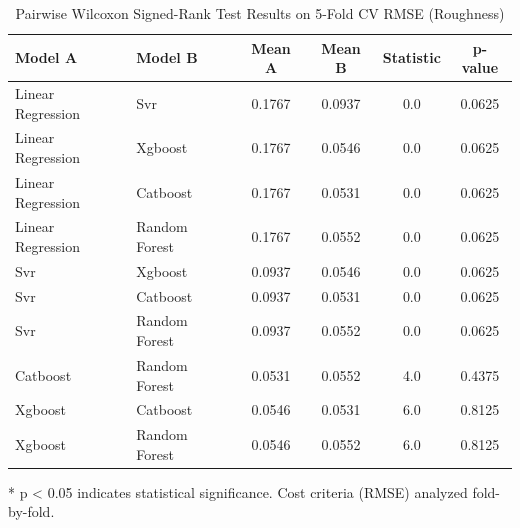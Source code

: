 \begin{table}[htbp]
\centering
\caption{Pairwise Wilcoxon Signed-Rank Test Results on 5-Fold CV RMSE (Roughness)}
\label{tab:wilcoxon_roughness}
\begin{tabular}{llcccc}
\toprule
\textbf{Model A} & \textbf{Model B} & \textbf{Mean A} & \textbf{Mean B} & \textbf{Statistic} & \textbf{p-value} \\
\midrule
Linear Regression & Svr & 0.1767 & 0.0937 & 0.0 & 0.0625 \\
Linear Regression & Xgboost & 0.1767 & 0.0546 & 0.0 & 0.0625 \\
Linear Regression & Catboost & 0.1767 & 0.0531 & 0.0 & 0.0625 \\
Linear Regression & Random Forest & 0.1767 & 0.0552 & 0.0 & 0.0625 \\
Svr & Xgboost & 0.0937 & 0.0546 & 0.0 & 0.0625 \\
Svr & Catboost & 0.0937 & 0.0531 & 0.0 & 0.0625 \\
Svr & Random Forest & 0.0937 & 0.0552 & 0.0 & 0.0625 \\
Catboost & Random Forest & 0.0531 & 0.0552 & 4.0 & 0.4375 \\
Xgboost & Catboost & 0.0546 & 0.0531 & 6.0 & 0.8125 \\
Xgboost & Random Forest & 0.0546 & 0.0552 & 6.0 & 0.8125 \\
\bottomrule
\end{tabular}
\footnotesize{* p < 0.05 indicates statistical significance. Cost criteria (RMSE) analyzed fold-by-fold.}
\end{table}